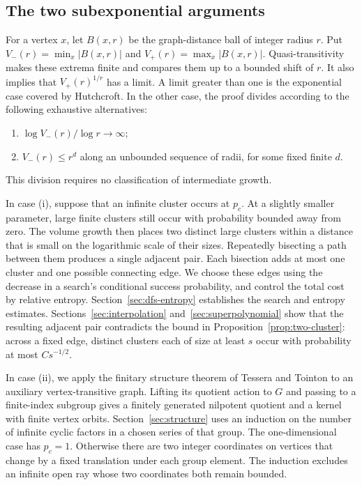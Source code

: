 \documentclass[11pt]{article}
\theoremstyle{definition}
\newcommand{\pc}{p_c}
\begin{document}
\subsection{The two subexponential arguments}

For a vertex $x$, let $B(x,r)$ be the graph-distance ball of integer
radius $r$. Put $V_-(r)=\min_x|B(x,r)|$ and
$V_+(r)=\max_x|B(x,r)|$. Quasi-transitivity makes these extrema finite
and compares them up to a bounded shift of $r$. It also implies that
$V_+(r)^{1/r}$ has a limit. A limit greater than one is the exponential
case covered by Hutchcroft. In the other case, the proof divides
according to the following exhaustive alternatives:
\begin{enumerate}[label=(\roman*)]
\item $\log V_-(r)/\log r\to\infty$;
\item $V_-(r)\le r^d$ along an unbounded sequence of radii, for some
fixed finite $d$.
\end{enumerate}
This division requires no classification of intermediate growth.

In case (i), suppose that an infinite cluster occurs at $\pc$.
At a slightly smaller parameter, large finite clusters still occur
with probability bounded away from zero. The volume growth then
places two distinct large clusters within a distance that is small
on the logarithmic scale of their sizes. Repeatedly bisecting a
path between them produces a single adjacent pair. Each bisection
adds at most one cluster and one possible connecting edge. We choose these
edges using the decrease in a search's conditional success
probability, and control the total cost by relative entropy.
Section~\ref{sec:dfs-entropy} establishes the search and entropy
estimates. Sections~\ref{sec:interpolation} and~\ref{sec:superpolynomial} show
that the resulting adjacent pair contradicts the bound in
Proposition~\ref{prop:two-cluster}: across a fixed edge, distinct
clusters each of size at least $s$ occur with probability at most
$Cs^{-1/2}$.

In case (ii), we apply the finitary structure theorem of Tessera and
Tointon \cite[Corollary~2.4]{TesseraTointon2021} to an auxiliary
vertex-transitive graph. Lifting its quotient action to $G$ and
passing to a finite-index subgroup gives a finitely generated
nilpotent quotient and a kernel with finite vertex orbits.
Section~\ref{sec:structure} uses an
induction on the number of infinite cyclic factors in a chosen
series of that group. The one-dimensional case has $\pc=1$.
Otherwise there are two integer coordinates on vertices that change
by a fixed translation under each group element. The induction excludes an infinite open ray whose
two coordinates both remain bounded.
\end{document}
